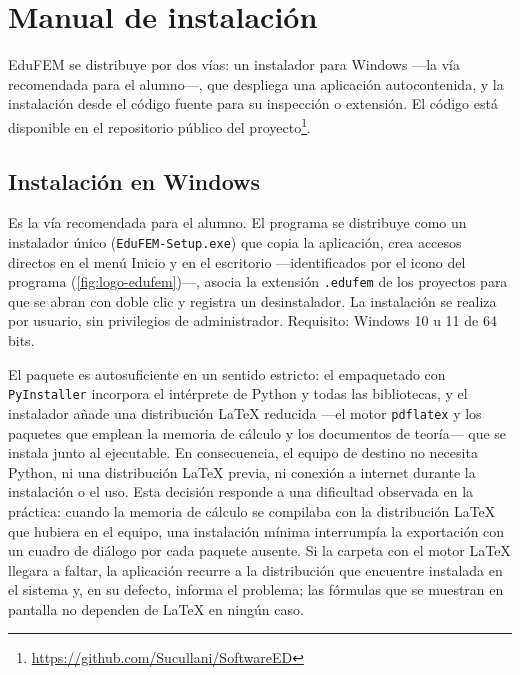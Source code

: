 
\chapter{Manual de instalación}
\label{anexo:instalacion}

EduFEM se distribuye por dos vías: un instalador para Windows —la vía recomendada para el alumno—, que despliega una aplicación autocontenida, y la instalación desde el código fuente para su inspección o extensión. El código está disponible en el repositorio público del proyecto\footnote{\url{https://github.com/Sucullani/SoftwareED}}.

\section{Instalación en Windows}

Es la vía recomendada para el alumno. El programa se distribuye como un instalador único (\texttt{EduFEM-Setup.exe}) que copia la aplicación, crea accesos directos en el menú Inicio y en el escritorio —identificados por el icono del programa (\autoref{fig:logo-edufem})—, asocia la extensión \texttt{.edufem} de los proyectos para que se abran con doble clic y registra un desinstalador. La instalación se realiza por usuario, sin privilegios de administrador. Requisito: Windows 10 u 11 de 64 bits.

El paquete es autosuficiente en un sentido estricto: el empaquetado con \texttt{PyInstaller} incorpora el intérprete de Python y todas las bibliotecas, y el instalador añade una distribución \LaTeX{} reducida —el motor \texttt{pdflatex} y los paquetes que emplean la memoria de cálculo y los documentos de teoría— que se instala junto al ejecutable. En consecuencia, el equipo de destino no necesita Python, ni una distribución \LaTeX{} previa, ni conexión a internet durante la instalación o el uso. Esta decisión responde a una dificultad observada en la práctica: cuando la memoria de cálculo se compilaba con la distribución \LaTeX{} que hubiera en el equipo, una instalación mínima interrumpía la exportación con un cuadro de diálogo por cada paquete ausente. Si la carpeta con el motor \LaTeX{} llegara a faltar, la aplicación recurre a la distribución que encuentre instalada en el sistema y, en su defecto, informa el problema; las fórmulas que se muestran en pantalla no dependen de \LaTeX{} en ningún caso.

